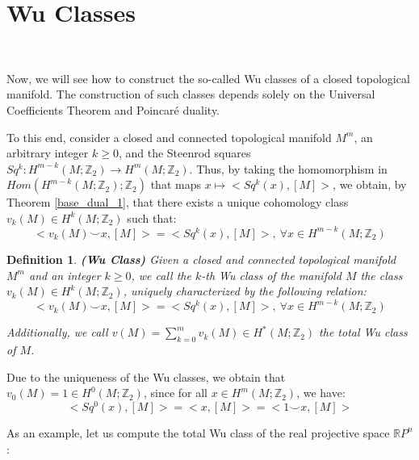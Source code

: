 \documentclass[12pt,oneside]{book}
\newtheorem{defi}   {Definition}[chapter]
\newcommand{\ds}{\displaystyle}
\newcommand{\RP}{\mathbb{R}P}
\newcommand{\Z}{\mathbb{Z}}
\newcommand{\ccup}{\smile}
\begin{document}
      
    \section{Wu Classes}\label{ap_wu}

    \

    Now, we will see how to construct the so-called Wu classes of a closed topological manifold. The construction 
    of such classes depends solely on the Universal Coefficients Theorem and Poincaré 
    duality.

    To this end, consider a closed and connected topological manifold $M^{m}$, an arbitrary integer $k\geq 0$, and the Steenrod squares 
    $Sq^{k}:H^{m-k}(M;\Z_{2})\to H^{m}(M;\Z_{2})$. Thus, by taking the homomorphism in $Hom(H^{m-k}(M;\Z_{2});\Z_{2})$ that maps 
    $x \mapsto <Sq^{k}(x),[M]>$, we obtain, by Theorem \ref{base_dual_1}, that there exists a unique cohomology class 
    $v_{k}(M)\in H^{k}(M;\Z_{2})$ such that:
    $$ <v_{k}(M)\ccup x,[M]>=<Sq^{k}(x),[M]>, \ \forall x\in H^{m-k}(M;\Z_{2}) $$
    
    \begin{defi}{\bf (Wu Class)}
    Given a closed and connected topological manifold $M^{m}$ and an integer $k\geq 0$, we call the $k$-th Wu class of the 
    manifold $M$ the class $v_{k}(M)\in H^{k}(M;\Z_{2})$, uniquely characterized by the following relation:
    $$ <v_{k}(M)\ccup x,[M]>=<Sq^{k}(x),[M]>, \ \forall x\in H^{m-k}(M;\Z_{2}) $$
    
    Additionally, we call $v(M)=\ds\sum_{k=0}^{m} v_{k}(M)\in H^{*}(M;\Z_{2})$ the total Wu class of $M$.
    \end{defi}
    
    Due to the uniqueness of the Wu classes, we obtain that $v_{0}(M)=1\in H^{0}(M;\Z_{2})$, since for all $x\in H^{m}(M;\Z_{2})$, we have:
    $$ <Sq^{0}(x),[M]>=<x,[M]>=<1\ccup x,[M]> $$
    
    As an example, let us compute the total Wu class of the real projective space $\RP^{n}$:
    
\end{document}
